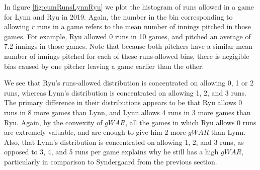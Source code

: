 \documentclass[12pt]{article}
\begin{document}
In figure \ref{fig:cumRunsLynnRyu} we plot the histogram of runs allowed in a game for Lynn and Ryu in 2019. Again, the number in the bin corresponding to allowing $r$ runs in a game refers to the mean number of innings pitched in those games. For example, Ryu allowed 0 runs in 10 games, and pitched an average of 7.2 innings in those games. Note that because both pitchers have a similar mean number of innings pitched for each of these runs-allowed bins, there is negigible bias caused by one pitcher leaving a game earlier than the other. 

We see that Ryu's runs-allowed distribution is concentrated on allowing 0, 1 or 2 runs, whereas Lynn's distribution is concentrated on allowing 1, 2, and 3 runs. The primary difference in their distributions appears to be that Ryu allows 0 runs in 8 more games than Lynn, and Lynn allows 4 runs in 3 more games than Ryu. Again, by the convexity of $gWAR$, all the games in which Ryu allows 0 runs are extremely valuable, and are enough to give him 2 more $gWAR$ than Lynn. Also, that Lynn's distribution is concentrated on allowing 1, 2, and 3 runs, as opposed to 3, 4, and 5 runs per game explains why he still has a high $gWAR$, particularly in comparison to Syndergaard from the previous section.







\end{document}
